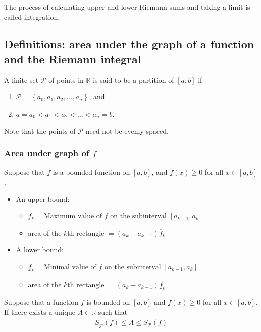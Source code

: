 \documentclass{report}
\begin{document}
			The process of calculating upper and lower Riemann sums and taking a limit is called integration.

		\subsection{Definitions: area under the graph of a function and the Riemann integral}

			A finite set $\mathcal{P}$ of points in $\mathbb{R}$ is said to be a partition of $[a,b]$ if
			\begin{enumerate}
				\item $\mathcal{P} = \left\{a_0, a_1, a_2, \dots, a_n\right\}$, and
				\item $a = a_0 <a_1<a_2<\dots<a_n = b$.
			\end{enumerate}
			Note that the points of $\mathcal{P}$ need not be evenly spaced.

			\subsubsection{Area under graph of $f$}

			Suppose that $f$ is a bounded function on $[a,b]$, and $f(x) \geq 0$ for all $x \in [a,b]$.
			\begin{itemize}
				\item An upper bound:
					\begin{itemize}
						\item $\overline{f}_k = \text{Maximum value of $f$ on the subinterval } [a_{k-1}, a_k]$
						\item area of the $k$th rectangle $ = (a_k - a_{k-1}) \overline{f}_k$
					\end{itemize}
				\item A lower bound:
					\begin{itemize}
						\item $\underline{f}_k = \text{Minimal value of $f$ on the subinterval } [a_{k-1}, a_k]$
						\item area of the $k$th rectangle $ = (a_k - a_{k-1}) \underline{f}_k$
					\end{itemize}
			\end{itemize}

			Suppose that a function $f$ is bounded on $[a,b]$ and $f(x) \geq 0$ for all $x \in [a,b]$. If there exists a unique $A \in \mathbb{R}$ such that
				\begin{align*}
					\underline{S}_{\mathcal{P}} (f) \leq A \leq \overline{S}_{\mathcal{P}} (f)
				\end{align*}
\end{document}
